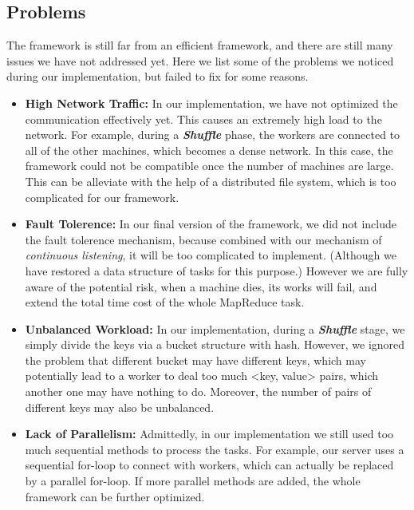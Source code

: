 \documentclass{article}
\begin{document}
	\subsection{Problems}
		The framework is still far from an efficient framework, and there are still many issues we have not addressed yet. Here we list some of the problems we noticed during our implementation, but failed to fix for some reasons.
			\begin{itemize}
				\item \textbf{High Network Traffic: }In our implementation, we have not optimized the communication effectively yet. This causes an extremely high load to the network. For example, during a \textit{\textbf{Shuffle}} phase, the workers are connected to all of the other machines, which becomes a dense network. In this case, the framework could not be compatible once the number of machines are large. This can be alleviate with the help of a distributed file system, which is too complicated for our framework.
				\item \textbf{Fault Tolerence: } In our final version of the framework, we did not include the fault tolerence mechanism, because combined with our mechanism of \textit{continuous listening}, it will be too complicated to implement. (Although we have restored a data structure of tasks for this purpose.) However we are fully aware of the potential risk, when a machine dies, its works will fail, and extend the total time cost of the whole MapReduce task.
				\item \textbf{Unbalanced Workload: } In our implementation, during a \textit{\textbf{Shuffle}} stage, we simply divide the keys via a bucket structure with hash. However, we ignored the problem that different bucket may have different keys, which may potentially lead to a worker to deal too much <key, value> pairs, which another one may have nothing to do. Moreover, the number of pairs of different keys may also be unbalanced.
				\item \textbf{Lack of Parallelism: } Admittedly, in our implementation we still used too much sequential methods to process the tasks. For example, our server uses a sequential for-loop to connect with workers, which can actually be replaced by a parallel for-loop. If more parallel methods are added, the whole framework can be further optimized.
\end{itemize}



\end{document}
